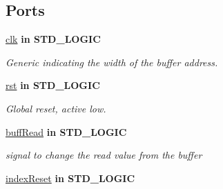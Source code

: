 \subsection*{Ports}
 \begin{DoxyCompactItemize}
\item 
\hypertarget{classDAC__buffer_a8120037e0ee47c35ba2d79242209c72e}{\hyperlink{classDAC__buffer_a8120037e0ee47c35ba2d79242209c72e}{clk}  {\bfseries {\bfseries \textcolor{vhdlkeyword}{in}\textcolor{vhdlchar}{ }}} {\bfseries \textcolor{comment}{S\-T\-D\-\_\-\-L\-O\-G\-I\-C}\textcolor{vhdlchar}{ }} }\label{classDAC__buffer_a8120037e0ee47c35ba2d79242209c72e}

\begin{DoxyCompactList}\small\item\em Generic indicating the width of the buffer address. \end{DoxyCompactList}\item 
\hypertarget{classDAC__buffer_aa7b7040844189161771c36cf6bbf172c}{\hyperlink{classDAC__buffer_aa7b7040844189161771c36cf6bbf172c}{rst}  {\bfseries {\bfseries \textcolor{vhdlkeyword}{in}\textcolor{vhdlchar}{ }}} {\bfseries \textcolor{comment}{S\-T\-D\-\_\-\-L\-O\-G\-I\-C}\textcolor{vhdlchar}{ }} }\label{classDAC__buffer_aa7b7040844189161771c36cf6bbf172c}

\begin{DoxyCompactList}\small\item\em Global reset, active low. \end{DoxyCompactList}\item 
\hypertarget{classDAC__buffer_a6895d06b697facf19161e9977457e157}{\hyperlink{classDAC__buffer_a6895d06b697facf19161e9977457e157}{buff\-Read}  {\bfseries {\bfseries \textcolor{vhdlkeyword}{in}\textcolor{vhdlchar}{ }}} {\bfseries \textcolor{comment}{S\-T\-D\-\_\-\-L\-O\-G\-I\-C}\textcolor{vhdlchar}{ }} }\label{classDAC__buffer_a6895d06b697facf19161e9977457e157}

\begin{DoxyCompactList}\small\item\em signal to change the read value from the buffer \end{DoxyCompactList}\item 
\hypertarget{classDAC__buffer_a7a77e72065924496dbe7ff565f233c10}{\hyperlink{classDAC__buffer_a7a77e72065924496dbe7ff565f233c10}{index\-Reset}  {\bfseries {\bfseries \textcolor{vhdlkeyword}{in}\textcolor{vhdlchar}{ }}} {\bfseries \textcolor{comment}{S\-T\-D\-\_\-\-L\-O\-G\-I\-C}\textcolor{vhdlchar}{ }} }\label{classDAC__buffer_a7a77e72065924496dbe7ff565f233c10}


\end{DoxyCompactItemize}
